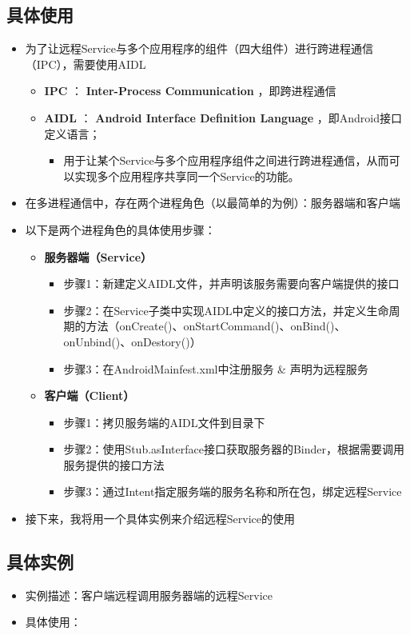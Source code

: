 \documentclass[9pt, b5paper]{article}
\begin{document}
\subsection{具体使用}
\label{sec-5-5}
\begin{itemize}
\item 为了让远程Service与多个应用程序的组件（四大组件）进行跨进程通信（IPC），需要使用AIDL
\begin{itemize}
\item \textbf{IPC} ： \textbf{Inter-Process Communication} ，即跨进程通信
\item \textbf{AIDL} ： \textbf{Android Interface Definition Language} ，即Android接口定义语言；
\begin{itemize}
\item 用于让某个Service与多个应用程序组件之间进行跨进程通信，从而可以实现多个应用程序共享同一个Service的功能。
\end{itemize}
\end{itemize}
\item 在多进程通信中，存在两个进程角色（以最简单的为例）：服务器端和客户端
\item 以下是两个进程角色的具体使用步骤：
\begin{itemize}
\item \textbf{服务器端（Service）}
\begin{itemize}
\item 步骤1：新建定义AIDL文件，并声明该服务需要向客户端提供的接口
\item 步骤2：在Service子类中实现AIDL中定义的接口方法，并定义生命周期的方法（onCreate()、onStartCommand()、onBind()、onUnbind()、onDestory()）
\item 步骤3：在AndroidMainfest.xml中注册服务 \& 声明为远程服务
\end{itemize}
\item \textbf{客户端（Client）}
\begin{itemize}
\item 步骤1：拷贝服务端的AIDL文件到目录下
\item 步骤2：使用Stub.asInterface接口获取服务器的Binder，根据需要调用服务提供的接口方法
\item 步骤3：通过Intent指定服务端的服务名称和所在包，绑定远程Service
\end{itemize}
\end{itemize}
\item 接下来，我将用一个具体实例来介绍远程Service的使用
\end{itemize}

\subsection{具体实例}
\label{sec-5-6}
\begin{itemize}
\item 实例描述：客户端远程调用服务器端的远程Service
\item 具体使用：
\end{itemize}
\end{document}
